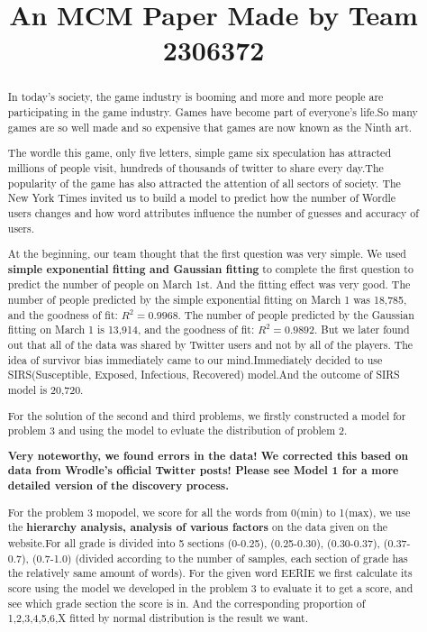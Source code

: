 \documentclass[12pt]{article}  %
\title{An MCM Paper Made by Team 2306372}  %
\begin{document}
\begin{abstract}
In today's society, the game industry is booming and more and more people are participating in the game industry. Games have become part of everyone's life.So many games are so well made and so expensive that games are now known as the Ninth art.

The wordle this game, only five letters, simple game six speculation has attracted millions of people visit, hundreds of thousands of twitter to share every day.The popularity of the game has also attracted the attention of all sectors of society. The New York Times invited us to build a model to predict how the number of Wordle users changes and how word attributes influence the number of guesses and accuracy of users.

At the beginning, our team thought that the first question was very simple. We used \textbf{simple exponential fitting and Gaussian fitting} to complete the first question to predict the number of people on March 1st. And the fitting effect was very good. The number of people predicted by the simple exponential fitting on March 1 was 18,785, and the goodness of fit:
$R^2 = 0.9968$. 
The number of people predicted by the Gaussian fitting on March 1 is 13,914, and the goodness of fit:
$R^2 = 0.9892$.
But we later found out that all of the data was shared by Twitter users and not by all of the players. The idea of survivor bias immediately came to our  mind.Immediately decided to use SIRS(Susceptible, Exposed, Infectious, Recovered) model.And the outcome of SIRS model is 20,720.


For the solution of the second and third problems, we firstly constructed a model for problem 3 and using the model to evluate the distribution of problem 2.

\textbf{Very noteworthy, we found errors in the data! We corrected this based on data from Wrodle's official Twitter posts! Please see Model 1 for a more detailed version of the discovery process.}

For the problem 3 mopodel, we score for all the words from 0(min) to 1(max), we use the \textbf{hierarchy analysis, analysis of various factors} on the data given on the website.For all grade is divided into 5 sections (0-0.25), (0.25-0.30), (0.30-0.37), (0.37-0.7), (0.7-1.0) (divided according to the number of samples, each section of grade has the relatively same amount of words). For the given word EERIE we first calculate its score using the model we developed in the problem 3 to evaluate it to get a score, and see which grade section the score is in. And the corresponding proportion of 1,2,3,4,5,6,X fitted by normal distribution is the result we want.


\end{abstract}
\end{document}
